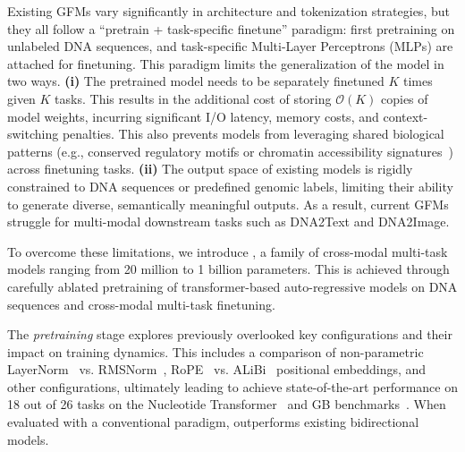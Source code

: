 Existing GFMs vary significantly in architecture and tokenization strategies, but they all follow a ``pretrain + task-specific finetune'' paradigm: first pretraining on unlabeled DNA sequences, and task-specific Multi-Layer Perceptrons (MLPs) are attached for finetuning. This paradigm limits the generalization of the model in two ways. \textbf{(i)} The pretrained model needs to be separately finetuned $K$ times given $K$ tasks. This results in the additional cost of storing $ \mathcal{O}(K) $ copies of model weights, incurring significant I/O latency, memory costs, and context-switching penalties. This also prevents models from leveraging shared biological patterns (e.g., conserved regulatory motifs or chromatin accessibility signatures~\cite{van2012motif, yang2023pioneer}) across finetuning tasks. \textbf{(ii)} The output space of existing models is rigidly constrained to DNA sequences or predefined genomic labels, limiting their ability to generate diverse, semantically meaningful outputs. As a result, current GFMs struggle for multi-modal downstream tasks such as DNA2Text and DNA2Image.


To overcome these limitations, we introduce \textsf{\method}, a family of cross-modal multi-task models ranging from 20 million to 1 billion parameters. This is achieved through carefully ablated pretraining of transformer-based auto-regressive models on DNA sequences and cross-modal multi-task finetuning. 

The \textit{pretraining} stage explores previously overlooked key configurations and their impact on training dynamics. This includes a comparison of non-parametric LayerNorm~\cite{ba2016layer} vs. RMSNorm~\cite{zhang2019root}, RoPE~\cite{su2024roformer} vs. ALiBi~\cite{press2021train} positional embeddings, and other configurations, ultimately leading \method to achieve state-of-the-art performance on 18 out of 26 tasks on the Nucleotide Transformer~\cite{dalla2024nucleotide} and GB benchmarks~\cite{grevsova2023genomic}. When evaluated with a conventional paradigm, \method outperforms existing bidirectional models.

